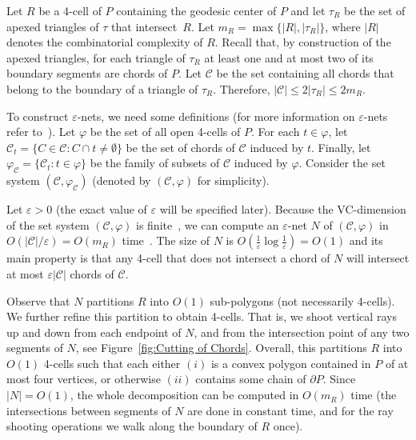 \documentclass[a4paper,UKenglish]{lipics}
\newcommand{\m}{\ensuremath{m_{\scriptscriptstyle R}}}
\newcommand{\tcell}{4-cell\xspace}
\newcommand{\tcells}{4-cells\xspace}
\begin{document}
Let $R$ be a \tcell of $P$ containing the geodesic center of $P$ and let $\tau_R$ be the set of apexed triangles of $\tau$ that intersect~$R$. 
Let $\m = \max\{|R|, |\tau_R|\}$, where $|R|$ denotes the combinatorial complexity of $R$.
Recall that, by construction of the apexed triangles, for each triangle of $\tau_R$ at least one and at most two of its boundary segments are chords of $P$.
Let $\mathcal C$ be the set containing all chords that belong to the boundary of a triangle of $\tau_R$. 
Therefore, $|\mathcal C| \leq 2|\tau_R|\leq 2\m$.

To construct $\varepsilon$-nets, we need some definitions (for more information on $\varepsilon$-nets refer to~\cite{ConstructionEpsilonNets}).
Let $\varphi$ be the set of all open \tcells of $P$.
For each $t\in \varphi$, let $\mathcal C_t = \{C\in \mathcal C: C\cap t \neq \emptyset\}$ be the set of chords of $\mathcal C$ induced by $t$. 
Finally, let $\varphi_\mathcal C = \{\mathcal C_t : t\in \varphi\}$ be the family of subsets of $\mathcal C$ induced by $\varphi$.
Consider the set system $(\mathcal C, \varphi_\mathcal C)$ (denoted by $(\mathcal C, \varphi)$ for simplicity). 

Let $\varepsilon >0$ (the exact value of $\varepsilon$ will be specified later).
Because the VC-dimension of the set system $(\mathcal C, \varphi)$ is finite~\cite{ArXivGeodesicCenter}, we can compute an $\varepsilon$-net $N$ of $(\mathcal C, \varphi)$ in $O(|\mathcal C|/\varepsilon) = O(\m)$ time~\cite{ConstructionEpsilonNets}. 
The size of $N$ is $O(\frac{1}{\varepsilon} \log \frac{1}{\varepsilon}) = O(1)$ and its main property is that any \tcell that does not intersect a chord of $N$ will intersect at most $\varepsilon |\mathcal C|$ chords of $\mathcal C$. 

Observe that $N$ partitions $R$ into $O(1)$ sub-polygons (not necessarily \tcells). We further refine this partition to obtain \tcells. That is, we shoot vertical rays up and down from each endpoint of $N$, and from the intersection point of  any two segments of $N$, see Figure~\ref{fig:Cutting of Chords}. Overall, this partitions $R$ into $O(1)$ \tcells such that each  either $(i)$  is a convex polygon contained in $P$ of at most four vertices, or otherwise $(ii)$ contains some chain of $\partial P$. 
Since $|N| = O(1)$, the whole decomposition can be computed in $O(\m)$ time (the intersections between segments of $N$ are done in constant time, and for the ray shooting operations we walk along the boundary of $R$ once).
\end{document}
